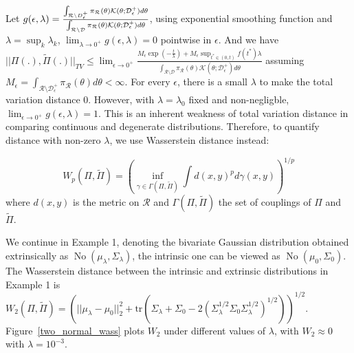 \documentclass[10pt]{article}
\newcommand{\mc}[1]{\mathcal{#1}}
\DeclareMathOperator{\No}{No}
\DeclareMathOperator{\1}{\mathbbm{1}}
\begin{document}
 Let $g(\epsilon,\lambda)=
\frac{\int_{\mc R \setminus \mc \mc D^+_\epsilon} \pi_{\mc R}(\theta) \mc K(\theta;\mc D^+_\epsilon)d\theta}{\int_{\mc R \setminus \mc D} \pi_{\mc R}(\theta) \mc K(\theta;\mc D^+_\epsilon)d\theta}$, using exponential smoothing function and $\lambda = \sup_k\lambda_k$, $\lim_{\lambda\rightarrow 0^+}g(\epsilon,\lambda)=0$ pointwise in $\epsilon$. And we have  $||\Pi(.), \tilde{\Pi}(.) ||_{TV}\le \lim_{\epsilon\rightarrow 0^+}\frac{{M_\epsilon} \exp(-\frac{t}{\lambda}) + {M_\epsilon} \sup_{t^*\in(0,t)} {f(t^*)}\lambda }{\int_{\mc R  \setminus \mc D} \pi_{\mc R}(\theta) \mc K(\theta;\mc D^+_{\epsilon})d\theta}$ assuming $M_\epsilon= \int_{\mc R \setminus \mc D^+_{\epsilon}} \pi_{\mc R }(\theta) d\theta<\infty$. For every $\epsilon$, there is a small $\lambda$ to make the total variation distance  $0$. However, with $\lambda=\lambda_0$ fixed and non-negligble, $\lim_{\epsilon\rightarrow 0^+}g(\epsilon,\lambda)=1$. This is an inherent weakness of total variation distance in comparing continuous and degenerate distributions. Therefore, to quantify distance with non-zero $\lambda$, we use Wasserstein distance instead:

$$W_p(\Pi,\tilde\Pi)=\left(\underset{\gamma\in \Gamma(\Pi,\tilde\Pi)}{\inf}\int d(x,y)^p d\gamma(x,y)\right)^{1/p}$$
 where $ d(x,y)$ is the metric on $\mc R$ and $\Gamma(\Pi,\tilde\Pi)$ the set of couplings of $\Pi$ and $\tilde\Pi$.

We continue in Example 1, denoting the bivariate Gaussian distribution obtained extrinsically as $\No(\mu_\lambda, \Sigma_\lambda)$, the intrinsic one can be viewed as $\No(\mu_0, \Sigma_0)$. The Wasserstein distance between the intrinsic and extrinsic distributions in Example 1 \citep{dowson1982frechet} is $W_2 (\Pi,\tilde\Pi)= \left( ||\mu_\lambda - \mu_0||_2^2+ \text{tr}(\Sigma_\lambda+\Sigma_0- 2 (\Sigma_\lambda^{1/2}  \Sigma_0 \Sigma_\lambda^{1/2})^{1/2}) \right)^{1/2} $. Figure~\ref{two_normal_wass} plots $W_2$ under different values of $\lambda$, with $W_2\approx 0$ with $\lambda=10^{-3}$.
\end{document}
